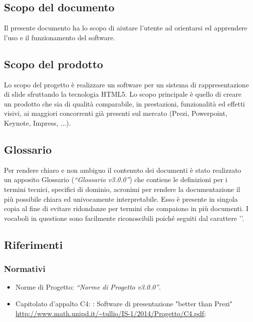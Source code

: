 \subsection{Scopo del documento}
Il presente documento ha lo scopo di aiutare l'utente ad orientarsi ed apprendere l'uso e il funzionamento del software.
\subsection{Scopo del prodotto}
Lo scopo del progetto è realizzare un software per un sistema di rappresentazione di slide sfruttando la tecnologia HTML5. Lo scopo principale è quello di creare un prodotto che sia di qualità comparabile, in prestazioni, funzionalità ed effetti visivi, ai maggiori concorrenti già presenti sul mercato (Prezi, Powerpoint, Keynote, Impress, ...).
\subsection{Glossario}
Per rendere chiaro e non ambiguo il contenuto dei documenti è stato realizzato un apposito Glossario (\textit{“Glossario v3.0.0”}) che contiene le definizioni per i termini tecnici, specifici di dominio, acronimi  per rendere la documentazione il più possibile chiara ed univocamente interpretabile. Esso è presente in singola copia al fine di evitare ridondanze per termini che compaiono in più documenti.
I vocaboli in questione sono facilmente riconoscibili poiché seguiti dal carattere ''.
\subsection{Riferimenti}
\subsubsection{Normativi}
\begin{itemize}
	\item Norme di Progetto: \textit{“Norme di Progetto v3.0.0”}.
	\item Capitolato d’appalto C4: \PROGETTO: Software di presentazione "better than Prezi" \\ \url{http://www.math.unipd.it/~tullio/IS-1/2014/Progetto/C4.pdf};
\end{itemize}
